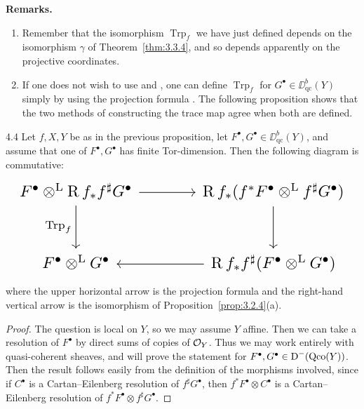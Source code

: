 \begin{samepage}
\textbf{Remarks.}
\begin{enumerate}
\item Remember that the isomorphism $\operatorname{Trp}_f$ we have just defined depends on the isomorphism $\gamma$ of Theorem~\ref{thm:3.3.4}, and so depends apparently on the projective coordinates.
\item If one does not wish to use  and , one can define $\operatorname{Trp}_f$ for $G^\bullet\in\DD_{\mathrm{qc}}^b(Y)$ simply by using the projection formula . The following proposition shows that the two methods of constructing the trace map agree when both are defined.
\end{enumerate}
\end{samepage}

\begin{bookproposition}{4.4}\label{prop:3.4.4}
Let $f,X,Y$ be as in the previous proposition, let $F^\bullet,G^\bullet\in\DD_{\mathrm{qc}}^b(Y)$, and assume that one of $F^\bullet,G^\bullet$ has finite Tor-dimension. Then the following diagram is commutative:
\[
\resizebox{\linewidth}{!}{\begin{tikzcd}[ampersand replacement=\&, row sep=large, column sep=large]
	F^\bullet \derivedtensor \RR f_* f^\sharp G^\bullet
	\arrow[r]
	\arrow[d, "{\operatorname{Trp}_f}"']
	\& \RR f_* (f^* F^\bullet \derivedtensor f^\sharp G^\bullet)
	\arrow[d] \\
	F^\bullet \derivedtensor G^\bullet
	\& \RR f_* f^\sharp (F^\bullet \derivedtensor G^\bullet)
	\arrow[l]
\end{tikzcd}}
\]
where the upper horizontal arrow is the projection formula  and the right-hand vertical arrow is the isomorphism of Proposition~\ref{prop:3.2.4}(a).
\end{bookproposition}

\begin{proof}
The question is local on $Y$, so we may assume $Y$ affine. Then we can take a resolution of $F^\bullet$ by direct sums of copies of $\mathcal{O}_Y$. Thus we may work entirely with quasi-coherent sheaves, and will prove the statement for $F^\bullet,G^\bullet\in\operatorname{D}^-(\operatorname{Qco}(Y))$. Then the result follows easily from the definition of the morphisms involved, since if $C^\bullet$ is a Cartan--Eilenberg resolution of $f^\sharp G^\bullet$, then $f^*F^\bullet\otimes C^\bullet$ is a Cartan--Eilenberg resolution of $f^*F^\bullet\otimes f^\sharp G^\bullet$.
\end{proof}

